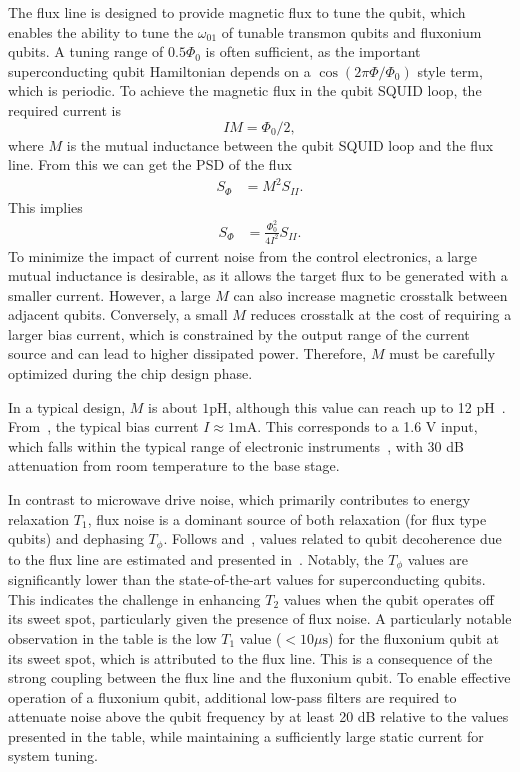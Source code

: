 \documentclass[a4paper,onecolumn,11pt,unpublished]{quantumarticle}
\begin{document}
The flux line is designed to provide magnetic flux to tune the qubit, which enables the ability to tune the $\omega_{01}$ of tunable transmon qubits and fluxonium qubits. A tuning range of $0.5\Phi_0$ is often sufficient, as the important superconducting qubit Hamiltonian depends on a $\cos(2\pi \Phi/\Phi_0)$ style term, which is periodic. To achieve the magnetic flux in the qubit SQUID loop, the required current is
\begin{equation}
  IM = \Phi_0 / 2, \label{eq:current_flux_relationship}
\end{equation}
where $M$ is the mutual inductance between the qubit SQUID loop and the flux line. From this we can get the PSD of the flux
\begin{align}
  S_{\Phi} & = M^2 S_{II}.  \label{eq:psd_phi_i}
\end{align}
This implies
\begin{align}
  S_{\Phi} & = \frac{\Phi_0^2}{4I^2} S_{II}.
\end{align}
 To minimize the impact of current noise from the control electronics, a large mutual inductance is desirable, as it allows the target flux to be generated with a smaller current. However, a large $M$ can also increase magnetic crosstalk between adjacent qubits. Conversely, a small $M$ reduces crosstalk at the cost of requiring a larger bias current, which is constrained by the output range of the current source and can lead to higher dissipated power. Therefore, $M$ must be carefully optimized during the chip design phase.

In a typical design, $M$ is about $1\mathrm{pH}$, although this value can reach up to 12 pH~\cite{Moskalenko2021Tunable,Moskalenko2022High}. From~, the typical bias current $I\approx 1\mathrm{mA}$. This corresponds to a 1.6 V input, which falls within the typical range of electronic instruments~\cite{ZurichAWGParameter}, with 30 dB attenuation from room temperature to the base stage.

In contrast to microwave drive noise, which primarily contributes to energy relaxation $T_1$, flux noise is a dominant source of both relaxation (for flux type qubits) and dephasing $T_\phi$. Follows  and~, values related to qubit decoherence due to the flux line are estimated and presented in~. Notably, the $T_\phi$ values are significantly lower than the state-of-the-art values for superconducting qubits. This indicates the challenge in enhancing $T_2$ values when the qubit operates off its sweet spot, particularly given the presence of flux noise. A particularly notable observation in the table is the low $T_1$ value ($< 10 \mu\mathrm{s}$) for the fluxonium qubit at its sweet spot, which is attributed to the flux line. This is a consequence of the strong coupling between the flux line and the fluxonium qubit. To enable effective operation of a fluxonium qubit, additional low-pass filters are required to attenuate noise above the qubit frequency by at least 20 dB relative to the values presented in the table, while maintaining a sufficiently large static current for system tuning.
\end{document}
